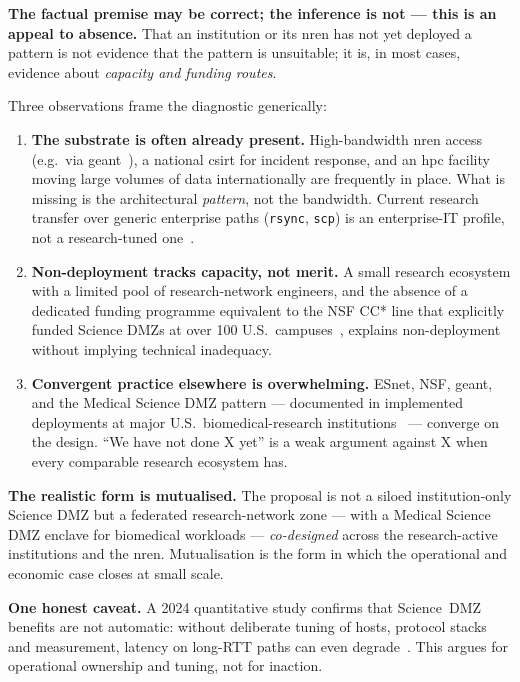 \begin{answerbox}[Answer to Q3.4]
\textbf{The factual premise may be correct; the inference is not --- this is an appeal to absence.} That an institution or its \gls{nren} has not yet deployed a pattern is not evidence that the pattern is unsuitable; it is, in most cases, evidence about \emph{capacity and funding routes}.

\medskip\noindent Three observations frame the diagnostic generically:
\begin{enumerate}[nosep]
    \item \textbf{The substrate is often already present.} High-bandwidth \gls{nren} access (e.g.\ via \gls{geant}~\cite{geant}), a national \gls{csirt} for incident response, and an \gls{hpc} facility moving large volumes of data internationally are frequently in place. What is missing is the architectural \emph{pattern}, not the bandwidth. Current research transfer over generic enterprise paths (\texttt{rsync}, \texttt{scp}) is an enterprise-IT profile, not a research-tuned one~\cite{dart2013, esnet-cases}.
    \item \textbf{Non-deployment tracks capacity, not merit.} A small research ecosystem with a limited pool of research-network engineers, and the absence of a dedicated funding programme equivalent to the NSF CC* line that explicitly funded Science DMZs at over 100 U.S.\ campuses~\cite{esnet-history,nsf-cc}, explains non-deployment without implying technical inadequacy.
    \item \textbf{Convergent practice elsewhere is overwhelming.} ESnet, NSF, \gls{geant}, and the Medical Science DMZ pattern --- documented in implemented deployments at major U.S.\ biomedical-research institutions~\cite{medical-sdmz} --- converge on the design. ``We have not done X yet'' is a weak argument against X when every comparable research ecosystem has.
\end{enumerate}

\medskip\noindent\textbf{The realistic form is mutualised.} The proposal is not a siloed institution-only Science DMZ but a federated research-network zone --- with a Medical Science DMZ enclave for biomedical workloads --- \emph{co-designed} across the research-active institutions and the \gls{nren}. Mutualisation is the form in which the operational and economic case closes at small scale.

\medskip\noindent\textbf{One honest caveat.} A 2024 quantitative study confirms that Science~DMZ benefits are not automatic: without deliberate tuning of hosts, protocol stacks and measurement, latency on long-RTT paths can even degrade~\cite{sciencedmz-perf}. This argues for operational ownership and tuning, not for inaction.
\end{answerbox}

